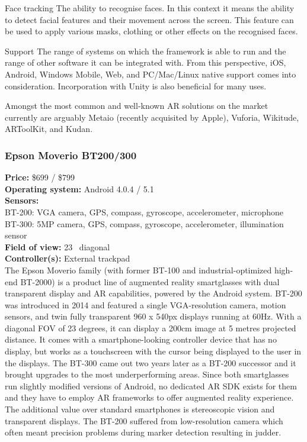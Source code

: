\documentclass[12pt, a4paper]{article}
\newenvironment{definitions}
{\begin{description}[style=nextline]}
{\end{description}}
\begin{document}
\begin{definitions}
\item[Face tracking] The ability to recognise faces. In this context it means the ability to detect facial features and their movement across the screen. This feature can be used to apply various masks, clothing or other effects on the recognised faces.
\item[Support] The range of systems on which the framework is able to run and the range of other software it can be integrated with. From this perspective, iOS, Android, Windows Mobile, Web, and PC/Mac/Linux native support comes into consideration. Incorporation with Unity is also beneficial for many uses.
\end{definitions}

Amongst the most common and well-known AR solutions on the market currently are arguably Metaio (recently acquisited by Apple), Vuforia, Wikitude, ARToolKit, and Kudan.

\subsubsection{Epson Moverio BT200/300}
\vspace*{-5mm}
\textbf{Price:} \$699 / \$799\\
\textbf{Operating system:} Android 4.0.4 / 5.1\\
\textbf{Sensors:} \\
BT-200: VGA camera, GPS, compass, gyroscope, accelerometer, microphone\\
BT-300: 5MP camera, GPS, compass, gyroscope, accelerometer, illumination sensor\\
\textbf{Field of view:} 23\degree~ diagonal\\
\textbf{Controller(s):} External trackpad \bigskip \\
The Epson Moverio family (with former BT-100 and industrial-optimized high-end BT-2000) is a product line of augmented reality smartglasses with dual transparent display and AR capabilities, powered by the Android system. BT-200 was introduced in 2014 and featured a single VGA-resolution camera, motion sensors, and twin fully transparent 960 x 540px displays running at 60Hz. With a diagonal FOV of 23 degrees, it can display a 200cm image at 5 metres projected distance. It comes with a smartphone-looking controller device that has no display, but works as a touchscreen with the cursor being displayed to the user in the displays. The BT-300 came out two years later as a BT-200 successor and it brought upgrades to the most underperforming areas. Since both smartglasses run slightly modified versions of Android, no dedicated AR SDK exists for them and they have to employ AR frameworks to offer augmented reality experience. The additional value over standard smartphones is stereoscopic vision and transparent displays. The BT-200 suffered from low-resolution camera which often meant precision problems during marker detection resulting in judder.
\end{document}

